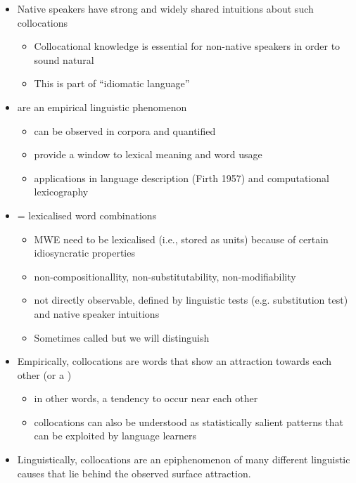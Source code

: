 \documentclass[a4paper,landscape,headrule,footrule,xetex]{foils}
\begin{document}

\begin{itemize}
\item Native speakers have strong and widely shared intuitions
about such collocations
\begin{itemize}
\item Collocational knowledge is essential for non-native
speakers in order to sound natural
\item This is part of ``idiomatic language''
\end{itemize}
\end{itemize}


\begin{itemize}
\item {} are an empirical linguistic phenomenon
\begin{itemize}
\item can be observed in corpora and quantified
\item provide a window to lexical meaning and word usage
\item applications in language description (Firth 1957) and
computational lexicography \citep{Sinclair:1991}
\end{itemize}
\item {} = lexicalised word combinations
\begin{itemize}
\item MWE need to be lexicalised (i.e., stored as units) because
of certain idiosyncratic properties
\item non-compositionallity, non-substitutability, non-modifiability
  \citep{Manning:Schuetze:1999}
\item not directly observable, defined by linguistic tests
(e.g. substitution test) and native speaker intuitions
\item Sometimes called  but we will distinguish
\end{itemize}
\end{itemize}


\begin{itemize}
\item   Empirically, collocations are words that show an attraction towards
  each other (or a ) 
\begin{itemize}
\item in other words, a tendency to
  occur near each other
\item  collocations can also be understood as
  statistically salient patterns that can be exploited by language
  learners
\end{itemize}
\item Linguistically, collocations are an epiphenomenon of many
  different linguistic causes that lie behind the observed surface
  attraction.   

\end{itemize}
\end{document}
